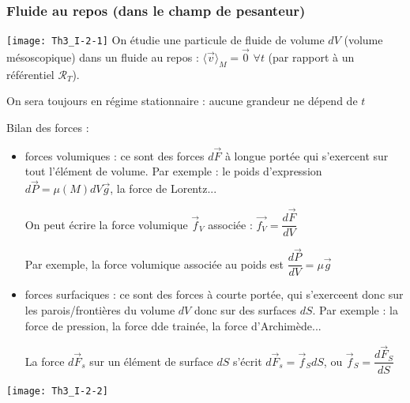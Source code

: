 \documentclass[a4paper,12pt]{book}
\begin{document}
\subsubsection{Fluide au repos (dans le champ de pesanteur)}
\texttt{[image: Th3\_I-2-1]}
On étudie une particule de fluide de volume $dV$ (volume mésoscopique) dans un fluide au repos : $\langle \vec{v}\rangle_M=\vec{0}$ $\forall t$ (par rapport à un référentiel $\mathcal{R}_T$).
\par On sera toujours en régime stationnaire : aucune grandeur ne dépend de $t$
\par Bilan des forces :\begin{itemize}
\item forces volumiques : ce sont des forces $d\vec{F}$ à longue portée qui s'exercent sur tout l'élément de volume. Par exemple : le poids d'expression $d\vec{P}=\mu(M)dV\vec{g}$, la force de Lorentz... \par On peut écrire la force volumique $\vec{f}_V$ associée : $\vec{f_V}=\dfrac{d\vec{F}}{dV}$ \par Par exemple, la force volumique associée au poids est $\dfrac{d\vec{P}}{dV}=\mu\vec{g}$
\item forces surfaciques : ce sont des forces à courte portée, qui s'exerceent donc sur les parois/frontières du volume $dV$ donc sur des surfaces $dS$. Par exemple : la force de pression, la force dde trainée, la force d'Archimède...
\par La force $d\vec{F}_s$ sur un élément de surface $dS$ s'écrit $d\vec{F}_s =\vec{f}_SdS$, ou $\vec{f}_S=\dfrac{d\vec{F}_S}{dS}$
\end{itemize}
\texttt{[image: Th3\_I-2-2]}
\end{document}
